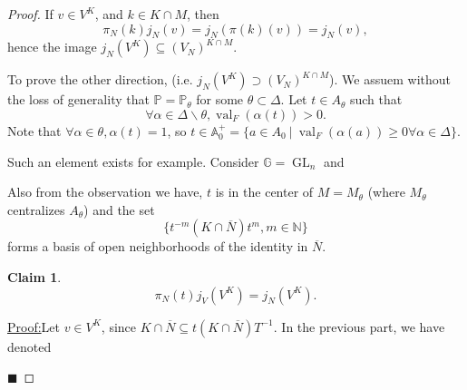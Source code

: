 \documentclass[8pt]{article}
\newtheorem{claim}{Claim}
\newenvironment{claimproof}[1]{\par\noindent\underline{Proof:}\space#1}{\hfill $\blacksquare$}
\DeclareMathOperator{\GL}{GL}
\DeclareMathOperator{\val}{val}
\newcommand{\N}[0]{\mathbb{N}}
\newcommand{\A}[0]{\mathbb{A}}
\newcommand{\G}[0]{\mathbb{G}}
\newcommand{\Para}[0]{\mathbb{P}}
\newcommand{\sep}[0]{\:|\:}
\begin{document}
\begin{proof}
If $v\in V^K$, and $k\in K\cap M$, then 
\begin{equation*}
  \pi_N(k)j_N(v) = j_N(\pi(k)(v)) = j_N(v),
\end{equation*}
hence the image $j_N(V^K)\subseteq(V_N)^{K\cap M}$.\\
\par To prove the other direction, (i.e. $j_N(V^K)\supset(V_N)^{K\cap M}$). We assuem without the loss of generality that $\Para = \Para_\theta$ for some $\theta\subset\Delta$. Let $t\in A_\theta$ such that 
\begin{equation*}
  \forall \alpha\in\Delta\backslash\theta, \val_F(\alpha(t)) >0 .
\end{equation*}
Note that $\forall \alpha\in\theta,\alpha(t) = 1$, so $t\in\A_0^+=\{a\in A_0\sep \val_F(\alpha(a)) \geq 0\forall \alpha\in\Delta\}$.\\
\par Such an element exists for example. Consider $\G=\GL_n$ and 
\par Also from the observation we have, $t$ is in the center of $M=M_\theta$ (where $M_\theta$ centralizes $A_\theta$) and the set 
\begin{equation*}
  \{t^{-m}(K\cap\overline{N})t^m,m\in\N\}
\end{equation*}
forms a basis of open neighborhoods of the identity in $\overline{N}$.
\begin{claim}
\begin{equation*}
  \pi_N(t)j_V(V^K) = j_N(V^K).
\end{equation*}
\end{claim}
\begin{claimproof}
  Let $v\in V^K$, since $K\cap\overline{N} \subseteq t(K\cap \overline{N})T^{-1}$. In the previous part, we have denoted 

\end{claimproof}
\end{proof}
\end{document}
